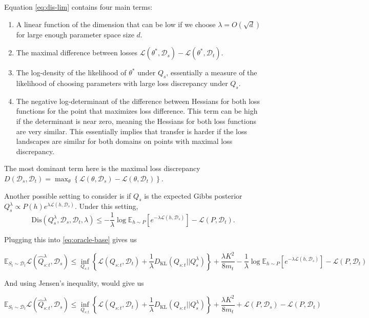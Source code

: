 \documentclass[letterpaper]{article}
\theoremstyle{definition}
\begin{document}
Equation \eqref{eq:dis-lim} contains four main terms:
\begin{enumerate}
	\item A linear function of the dimension that can be low if we choose $\lambda=O(\sqrt{d})$ for large enough parameter space size $d$.
	\item The maximal difference between losses $\mathcal{L}(\theta^*, \mathcal{D}_s)-\mathcal{L}(\theta^*, \mathcal{D}_t)$.
	\item The log-density of the likelihood of $\theta^*$ under $Q_s$, essentially a measure of the likelihood of choosing parameters with large loss discrepancy under $Q_s$.
	\item The negative log-determinant of the difference between Hessians for both loss functions for the point that maximizes loss difference. This term can be high if the determinant is near zero, meaning the Hessians for both loss functions are very similar. This essentially implies that transfer is harder if the loss landscapes are similar for both domains on points with maximal loss discrepancy.
\end{enumerate}

The most dominant term here is the maximal loss discrepancy $D(\mathcal{D}_s, \mathcal{D}_t)=\max_{\theta}\left \{\mathcal{L}(\theta, \mathcal{D}_s)-\mathcal{L}(\theta, \mathcal{D}_t) \right \}$.


Another possible setting to consider is if $Q_s$ is the expected Gibbs posterior $Q^{\lambda}_{s}\propto P(h)e^{\lambda\mathcal{L}(h,\mathcal{D}_s)}$. Under this setting, $$\mathrm{Dis}(Q^{\lambda}_{s},\mathcal{D}_s, \mathcal{D}_t, \lambda )\leq -\frac{1}{\lambda}\log\mathbb{E}_{h\sim P}\left [e^{-\lambda\mathcal{L}(h,\mathcal{D}_s)} \right ]-\mathcal{L}(P,\mathcal{D}_t).$$

Plugging this into \eqref{eq:oracle-base} gives us

$$
\mathbb{E}_{S_t\sim \mathcal{D}_t}\mathcal{L}( \hat{Q}^{\lambda}_{s:t},\mathcal{D}_s)\leq \inf_{Q_{s:t}}\left \{ \mathcal{L}(Q_{s:t},\mathcal{D}_t) + \frac{1}{\lambda}D_{\mathrm{KL}}(Q_{s:t}||Q^{\lambda}_{s}) \right \}+\frac{\lambda K^2}{8m_t}-\frac{1}{\lambda}\log\mathbb{E}_{h\sim P}\left [e^{-\lambda\mathcal{L}(h,\mathcal{D}_s)} \right ]-\mathcal{L}(P,\mathcal{D}_t)
$$

And using Jensen's inequality, would give us

\begin{equation}
\mathbb{E}_{S_t\sim \mathcal{D}_t}\mathcal{L}( \hat{Q}^{\lambda}_{s:t},\mathcal{D}_s)\leq \inf_{Q_{s:t}}\left \{ \mathcal{L}(Q_{s:t},\mathcal{D}_t) + \frac{1}{\lambda}D_{\mathrm{KL}}(Q_{s:t}||Q^{\lambda}_{s}) \right \}+\frac{\lambda K^2}{8m_t}+\mathcal{L}(P,\mathcal{D}_s)-\mathcal{L}(P,\mathcal{D}_t)
\end{equation}
\end{document}
